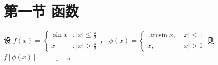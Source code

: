 \section{第一节 函数}
\begin{Problem}
    设
    $
    f(x)=
    \begin{cases}
    \sin{x}&,  |x|\leq \frac{\pi}{2} \\
    x&,  |x| > \frac{\pi}{2}
    \end{cases}
    $，
    $
    \phi(x)=
    \begin{cases}
    \arcsin x,&|x| \le 1 \\
    x,  &|x| > 1
    \end{cases}
    $
    则$f[\phi(x)]=\underline{\quad\quad\quad}$。
\end{Problem}
